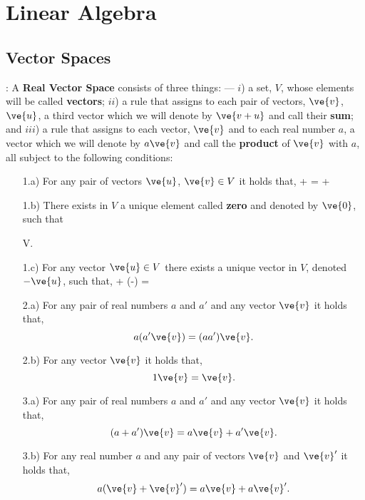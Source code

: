 \chapter{Linear Algebra}


\section{Vector Spaces}

:
A {\bf Real Vector Space} consists of three things:
--- $i$) a set, $V$, whose elements will be called {\bf vectors};
$ii$) a rule that assigns to each pair of vectors, $\ve{v}$,
$\ve{u}$, a third vector which we will denote by $\ve{v+u}$ and call
their {\bf sum}; and $iii$) a rule that assigns to each vector, $\ve{v}$ and
to each real number $a$, a vector which we will denote by $a\ve{v}$ and
call the {\bf product} of $\ve{v}$ with $a$, all subject to
the following conditions:

\begin{itemize}

\item[1.a)] For any pair of vectors $\ve{u}$, $\ve{v} \in V$
it holds that,
\beq
{} +  =  + 
\eeq

\item[1.b)] There exists in $V$ a unique element called {\bf zero} and denoted by $\ve{0}$,
such that 

\beq
{} \;\forall {}  \in V.
\eeq

\item[1.c)] For any vector $\ve{u} \in V$ there exists a unique
vector in $V$, denoted $-\ve{u}$, such that,
\beq
{} + (-) = 
\eeq

\item[2.a)] For any pair of real numbers $a$ and $a'$ and any vector 
$\ve{v}$ it holds that,
\[
a(a'\ve{v}) = (aa')\ve{v}.
\]

\item[2.b)] For any vector 
$\ve{v}$ it holds that,
\[
1\ve{v} = \ve{v}.
\]

\item[3.a)] For any pair of real numbers $a$ and $a'$ and any vector 
$\ve{v}$ it holds that,
\[
(a+a')\ve{v} = a\ve{v} + a'\ve{v}.
\]

\item[3.b)] For any real number $a$ and any pair of vectors
$\ve{v}$ and $\ve{v}'$ it holds that,
\[
a(\ve{v}  + \ve{v}') = a\ve{v} + a\ve{v}'.
\]

\end{itemize}

